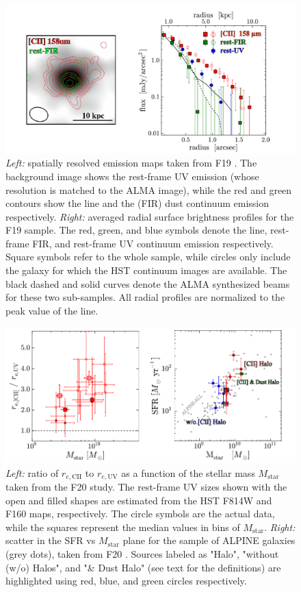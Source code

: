 \begin{figure}
    \centering
    \includegraphics[width=1.0\textwidth]{plots/fuji_data_final.png}
    \caption{\textit{Left:} spatially resolved emission maps taken from F19 \citep{Fujimoto19}. The background image shows the rest-frame UV emission (whose resolution is matched to the ALMA image), while the red and green contours show the \CII line and the (FIR) dust continuum emission respectively. \textit{Right:} averaged radial surface brightness profiles for the F19 \citep{Fujimoto19} sample. The red, green, and blue symbols denote the \CII line, rest-frame FIR, and rest-frame UV continuum emission respectively. Square symbols refer to the whole sample, while circles only include the galaxy for which the HST continuum images are available. The black dashed and solid curves denote the ALMA synthesized beams for these two sub-samples. All radial profiles are normalized to the peak value of the \CII line. 
    }
    \label{fig:fuji_data}
\end{figure}


\begin{figure}
    \centering
    \includegraphics[width=1.0\textwidth]{plots/alpine_effective_radius_final.png}
    \caption{\textit{Left:} ratio of $r_{e,\mathrm{CII}}$ to $r_{e,\mathrm{UV}}$ as a function of the stellar mass $M_\mathrm{star}$ taken from the F20 \citep{Fujimoto:2020qzo} study. The rest-frame UV sizes shown with the open and filled shapes are estimated from the HST F814W and F160 maps, respectively. The circle symbols are the actual data, while the squares represent the median values in bins of $M_\mathrm{star}$. \textit{Right:} scatter in the SFR vs $M_\mathrm{star}$ plane for the sample of ALPINE galaxies (grey dots), taken from F20 \citep{Fujimoto:2020qzo}. Sources labeled as "\CII Halo", "without (w/o) \CII Halos", and "\CII \& Dust Halo" (see text for the definitions) are highlighted using red, blue, and green circles respectively.
    }
    \label{fig:alpine_trends}
\end{figure}


